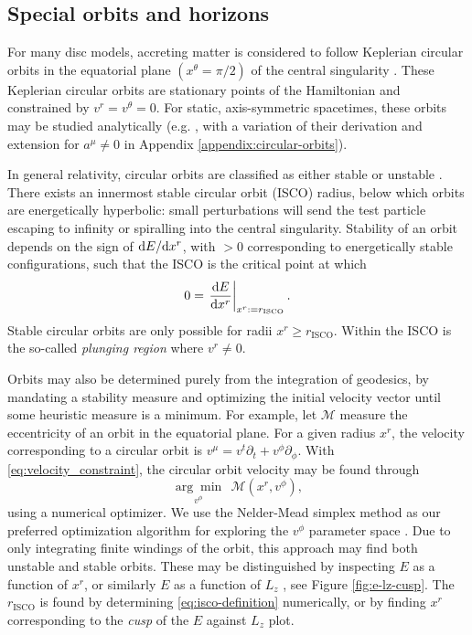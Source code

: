 \subsection{Special orbits and horizons}
\label{sec:special-orbits}

For many disc models, accreting matter is considered to follow Keplerian circular orbits in the equatorial plane $(x^\theta = \pi/2)$ of the central singularity \citep{shakura_black_1973}. These Keplerian circular orbits are stationary points of the Hamiltonian and constrained by $v^r = v^\theta = 0$. For static, axis-symmetric spacetimes, these orbits may be studied analytically (e.g. \citealp{johannsen_regular_2013}, with a variation of their derivation and extension for $a^\mu \neq 0$ in Appendix \ref{appendix:circular-orbits}).

In general relativity, circular orbits are classified as either stable or unstable \citep{wilkins_bound_1972,bardeen_rotating_1972}. There exists an innermost stable circular orbit (ISCO) radius, below which orbits are energetically hyperbolic: small perturbations will send the test particle escaping to infinity or spiralling into the central singularity.  Stability of an orbit depends on the sign of $\text{d} E / \text{d} x^r$, with $>0$ corresponding to energetically stable configurations, such that the ISCO is the critical point at which 
\begin{equation}
    \label{eq:isco-definition}
    0 = \left. \frac{\text{d} E}{\text{d} x^r} \right\rvert_{x^r := r_\text{ISCO}}.
\end{equation}
Stable circular orbits are only possible for radii $x^r \geq r_\text{ISCO}$. Within the ISCO is the so-called \textit{plunging region} where $v^r \neq 0$. 


Orbits may also be determined purely from the integration of geodesics, by mandating a stability measure and optimizing the initial velocity vector until some heuristic measure is a minimum. For example, let $\mathscr{M}$ measure the eccentricity of an orbit in the equatorial plane. For a given radius $x^r$, the velocity corresponding to a circular orbit is $v^\mu = v^t \partial_t + v^\phi \partial_\phi $. With \eqref{eq:velocity_constraint}, the circular orbit velocity may be found through
\begin{equation}
    \underset{v^\phi}{\arg \min}\ \ \mathscr{M}(x^r, v^\phi),
\end{equation}
using a numerical optimizer. We use the Nelder-Mead simplex method as our preferred optimization algorithm for exploring the $v^\phi$ parameter space \citep{nelder_simplex_1965}. Due to only integrating finite windings of the orbit, this approach may find both unstable and stable orbits. These may be distinguished by inspecting $E$ as a function of $x^r$, or similarly $E$ as a function of $L_z$ \citep{hackmann_charged_2013}, see Figure \ref{fig:e-lz-cusp}. The $r_\text{ISCO}$ is found by determining \eqref{eq:isco-definition} numerically, or by finding $x^r$ corresponding to the \textit{cusp} of the $E$ against $L_z$ plot.


